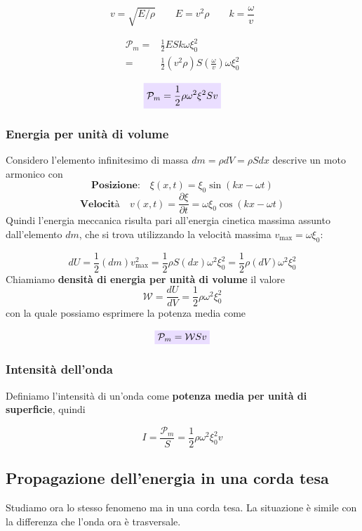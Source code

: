 \documentclass[x11names]{article}
\newcommand{\viola}[1]{\colorbox{yred}{$\displaystyle #1$}}
\begin{document}
	\[ 
	\boxed{v = \sqrt{E/\rho} \qquad E = v^2 \rho} \qquad \boxed{k = \frac{\omega}{v}}
	\]
	
	\begin{align*}
		\mathcal{P}_m =& \frac{1}{2} ESk\omega \xi_0^2  \\
			=& \frac{1}{2} (v^2 \rho)S\left(\frac{\omega}{v}\right) \omega\xi_0^2 
	\end{align*}
	
	\begin{equation}
		\viola{\mathcal{P}_m = \frac{1}{2}\rho \omega^2 \xi^2 S v}
	\end{equation}
	
	
	\subsubsection{Energia per unità di volume}
	Considero l'elemento infinitesimo di massa \(dm = \rho dV = \rho S dx\) descrive un moto armonico con 
	\[ 
	\textbf{Posizione:} \quad \xi(x,t) = \xi_0\sin\left(kx - \omega t\right) 
	\]
	\[ 
	\textbf{Velocità} \quad v(x,t)= \frac{\partial\xi}{\partial t} = \omega \xi_0\cos\left(kx - \omega t\right) 
	\]
	Quindi l'energia meccanica risulta pari all'energia cinetica massima assunto dall'elemento \(dm\), che si trova utilizzando la velocità massima \(v_{\text{max}} = \omega \xi_0\):
	
	\[ 
	dU = \frac{1}{2}(dm)v_{\text{max}}^2 = \frac{1}{2}\rho S (dx)\omega^2 \xi_0^2 = \frac{1}{2}\rho (dV)\omega^2 \xi_0^2
	\]
	Chiamiamo \textbf{densità di energia per unità di volume} il valore 
	\[
	\mathcal{W} = \frac{dU}{dV} = \frac{1}{2}\rho \omega^2\xi_0^2
	\]
	con la quale possiamo esprimere la potenza media come 
	
	\begin{equation}
		\viola{\mathcal{P}_m = \mathcal{W}S v}
	\end{equation}

	
	\subsubsection{Intensità dell'onda}
	Definiamo l'intensità di un'onda come  \textbf{potenza media per unità di superficie}, quindi
	
	\[
	I = \frac{\mathcal{P}_m}{S} = \frac{1}{2}\rho\omega^2\xi_0^2v
	\]
	
	\subsection{Propagazione dell'energia in una corda tesa}
	Studiamo ora lo stesso fenomeno ma in una corda tesa. La situazione è simile con la differenza che l'onda ora è trasversale.
	
\end{document}
